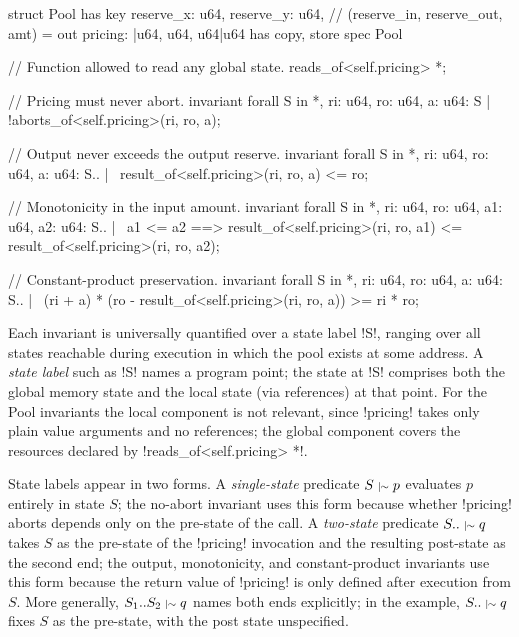 \begin{MoveBox}
  struct Pool has key {
    reserve_x: u64, reserve_y: u64,
    // (reserve_in, reserve_out, amt) = out
    pricing: |u64, u64, u64|u64 has copy, store
  }
  spec Pool {
    // Function allowed to read any global state.
    reads_of<self.pricing> *;

    // Pricing must never abort.
    invariant forall S in *, ri: u64, ro: u64, a: u64:
      S |~ !aborts_of<self.pricing>(ri, ro, a);

    // Output never exceeds the output reserve.
    invariant forall S in *, ri: u64, ro: u64, a: u64:
     S.. |~ result_of<self.pricing>(ri, ro, a) <= ro;

    // Monotonicity in the input amount.
    invariant forall S in *, ri: u64, ro: u64,
                        a1: u64, a2: u64:
      S.. |~ a1 <= a2 ==>
        result_of<self.pricing>(ri, ro, a1)
             <= result_of<self.pricing>(ri, ro, a2);

    // Constant-product preservation.
    invariant forall S in *, ri: u64, ro: u64, a: u64:
      S.. |~
        (ri + a)
        * (ro - result_of<self.pricing>(ri, ro, a))
          >= ri * ro;
  }
\end{MoveBox}

Each invariant is universally quantified over a state label !S!, ranging over all states reachable during execution in which the pool exists at some address.
A \emph{state label} such as !S! names a program point; the state at !S! comprises both the global memory state and the local state (via references) at that point.
For the Pool invariants the local component is not relevant, since !pricing! takes only plain value arguments and no references; the global component covers the resources declared by !reads_of<self.pricing> *!.

State labels appear in two forms.
A \emph{single-state} predicate $S \mathrel{{\scriptstyle\vert}\mkern-1mu{\scriptstyle\sim}} p$ evaluates $p$ entirely in state $S$; the no-abort invariant uses this form because whether !pricing! aborts depends only on the pre-state of the call.
A \emph{two-state} predicate $S.. \mathrel{{\scriptstyle\vert}\mkern-1mu{\scriptstyle\sim}} q$ takes $S$ as the pre-state of the !pricing! invocation and the resulting post-state as the second end; the output, monotonicity, and constant-product invariants use this form because the return value of !pricing! is only defined after execution from $S$.
More generally, $S_1..S_2 \mathrel{{\scriptstyle\vert}\mkern-1mu{\scriptstyle\sim}} q$ names both ends explicitly; in the example, $S.. \mathrel{{\scriptstyle\vert}\mkern-1mu{\scriptstyle\sim}} q$ fixes $S$ as the pre-state, with the post state unspecified.

